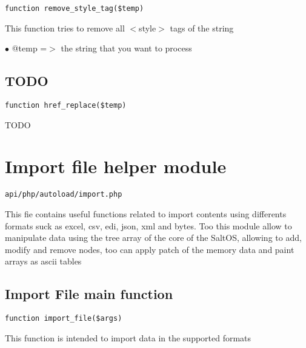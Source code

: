 \documentclass[a4paper]{book}
\begin{document}
\begin{lstlisting}
function remove_style_tag($temp)
\end{lstlisting}

This function tries to remove all $<$style$>$ tags of the string

\begin{compactitem}
\item[\color{myblue}$\bullet$] @temp =$>$ the string that you want to process
\end{compactitem}

\hypertarget{toc152}{}
\subsection{TODO}

\begin{lstlisting}
function href_replace($temp)
\end{lstlisting}

TODO

\hypertarget{toc153}{}
\section{Import file helper module}

\begin{lstlisting}
api/php/autoload/import.php
\end{lstlisting}

This fie contains useful functions related to import contents using differents formats suck as
excel, csv, edi, json, xml and bytes. Too this module allow to manipulate data using the tree
array of the core of the SaltOS, allowing to add, modify and remove nodes, too can apply patch
of the memory data and paint arrays as ascii tables

\hypertarget{toc154}{}
\subsection{Import File main function}

\begin{lstlisting}
function import_file($args)
\end{lstlisting}

This function is intended to import data in the supported formats
\end{document}
